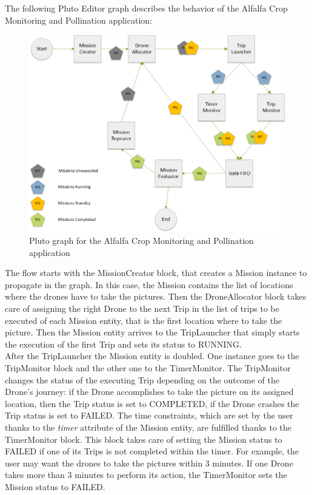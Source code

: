 The following Pluto Editor graph describes the behavior of the Alfalfa Crop Monitoring and Pollination\cite{alfalfa} application:
\\

\newpage

\begin{figure}[h!]
  \centering
  \includegraphics[width=\linewidth]{pictures/Alfalfa_Diagram.png}
  \caption{Pluto graph for the Alfalfa Crop Monitoring and Pollination application}
  \label{fig:alfalfaGraph}
\end{figure}



The flow starts with the MissionCreator block, that creates a Mission instance to propagate in the graph.
In this case, the Mission contains the list of locations where the drones have to take the pictures.
Then the DroneAllocator block takes care of assigning the right Drone to the next Trip in the list of trips to be executed of each Mission entity, that is the first location where to take the picture.
Then the Mission entity arrives to the TripLauncher that simply starts the execution of the first Trip and sets its status to RUNNING.
\\

After the TripLauncher the Mission entity is doubled. One instance goes to the TripMonitor block and the other one to the TimerMonitor.
The TripMonitor changes the status of the executing Trip depending on the outcome of the Drone's journey:
if the Drone accomplishes to take the picture on its assigned location, then the Trip status is set to COMPLETED,
if the Drone crashes the Trip status is set to FAILED.
The time constraints, which are set by the user thanks to the \textit{timer} attribute of the Mission entity, are fulfilled thanks to the TimerMonitor block.
This block takes care of setting the Mission status to FAILED if one of its Trips is not completed within the timer.
For example, the user may want the drones to take the pictures within 3 minutes.
If one Drone takes more than 3 minutes to perform its action, the TimerMonitor sets the Mission status to FAILED.
\\


